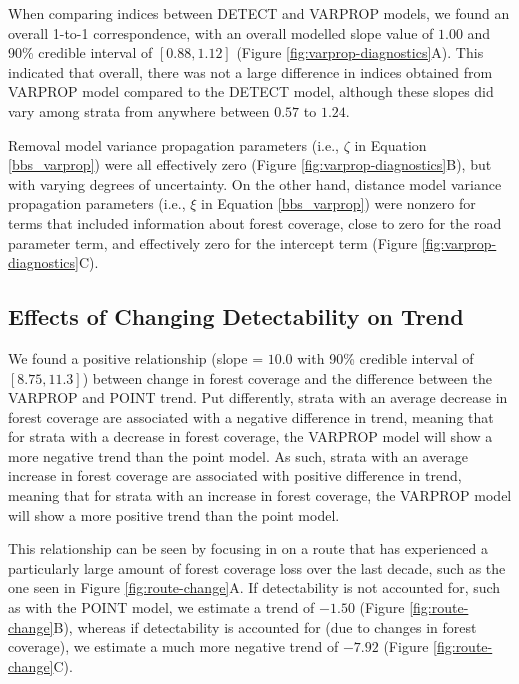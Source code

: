 \documentclass[12pt]{article}
\begin{document}
\par When comparing indices between DETECT and VARPROP models, we found an overall 1-to-1 correspondence, with an overall modelled slope value of $1.00$ and 90\% credible interval of $[0.88, 1.12]$ (Figure \ref{fig:varprop-diagnostics}A).
This indicated that overall, there was not a large difference in indices obtained from VARPROP model compared to the DETECT model, although these slopes did vary among strata from anywhere between $0.57$ to $1.24$.

\par Removal model variance propagation parameters (i.e., $\zeta$ in Equation \ref{bbs_varprop}) were all effectively zero (Figure \ref{fig:varprop-diagnostics}B), but with varying degrees of uncertainty.
On the other hand, distance model variance propagation parameters (i.e., $\xi$ in Equation \ref{bbs_varprop}) were nonzero for terms that included information about forest coverage, close to zero for the road parameter term, and effectively zero for the intercept term (Figure \ref{fig:varprop-diagnostics}C).

\subsection{Effects of Changing Detectability on Trend}
\par We found a positive relationship (slope = $10.0$ with 90\% credible interval of $[8.75, 11.3]$) between change in forest coverage and the difference between the VARPROP and POINT trend.
Put differently, strata with an average decrease in forest coverage are associated with a negative difference in trend, meaning that for strata with a decrease in forest coverage, the VARPROP model will show a more negative trend than the point model.
As such, strata with an average increase in forest coverage are associated with positive difference in trend, meaning that for strata with an increase in forest coverage, the VARPROP model will show a more positive trend than the point model.

\par This relationship can be seen by focusing in on a route that has experienced a particularly large amount of forest coverage loss over the last decade, such as the one seen in Figure \ref{fig:route-change}A. 
If detectability is not accounted for, such as with the POINT model, we estimate a trend of $-1.50$ (Figure \ref{fig:route-change}B), whereas if detectability is accounted for (due to changes in forest coverage), we estimate a much more negative trend of $-7.92$ (Figure \ref{fig:route-change}C).
\end{document}
